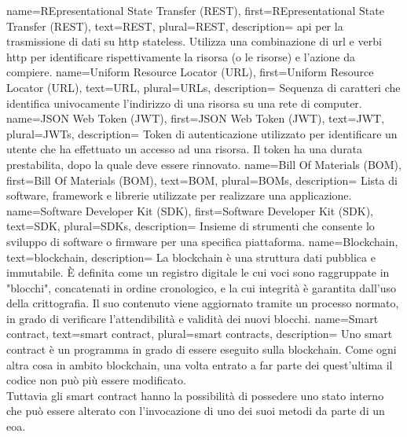 {
    name={REpresentational State Transfer (REST)},
    first={REpresentational State Transfer (REST)},
    text={REST},
    plural={REST},
    description={
            \gls{api} per la trasmissione di dati su \gls{http} stateless.
            Utilizza una combinazione di \gls{url} e verbi \gls{http} per identificare
            rispettivamente la risorsa (o le risorse) e l'azione da compiere.
        }
}
{
    name={Uniform Resource Locator (URL)},
    first={Uniform Resource Locator (URL)},
    text={URL},
    plural={URLs},
    description={
            Sequenza di caratteri che identifica univocamente l'indirizzo di una risorsa su una rete di computer.
        }
}
{
    name={JSON Web Token (JWT)},
    first={JSON Web Token (JWT)},
    text={JWT},
    plural={JWTs},
    description={
            Token di autenticazione utilizzato per identificare un utente che ha effettuato un accesso ad una risorsa.
            Il token ha una durata prestabilita, dopo la quale deve essere rinnovato.
        }
}
{
    name={Bill Of Materials (BOM)},
    first={Bill Of Materials (BOM)},
    text={BOM},
    plural={BOMs},
    description={
            Lista di software, framework e librerie utilizzate per realizzare una applicazione.
        }
}
{
    name={Software Developer Kit (SDK)},
    first={Software Developer Kit (SDK)},
    text={SDK},
    plural={SDKs},
    description={
            Insieme di strumenti che consente lo sviluppo di software o firmware per una specifica piattaforma.
        }
}
{
    name={Blockchain},
    text={blockchain},
    description={
            La blockchain è una struttura dati pubblica e immutabile.
            È definita come un registro digitale le cui voci sono raggruppate in "blocchi", concatenati in ordine cronologico, e la cui integrità è garantita dall'uso della crittografia.
            Il suo contenuto viene aggiornato tramite un processo normato, in grado di verificare l'attendibilità e validità dei nuovi blocchi.
        }
}
{
    name={Smart contract},
    text={smart contract},
    plural={smart contracts},
    description={
            Uno smart contract è un programma in grado di essere eseguito sulla blockchain.
            Come ogni altra cosa in ambito blockchain, una volta entrato a far parte dei quest'ultima
            il codice non può più essere modificato. \\
            Tuttavia gli smart contract hanno la possibilità di possedere uno stato interno che può essere
            alterato con l'invocazione di uno dei suoi metodi da parte di un \gls{eoa}.
        }
}
